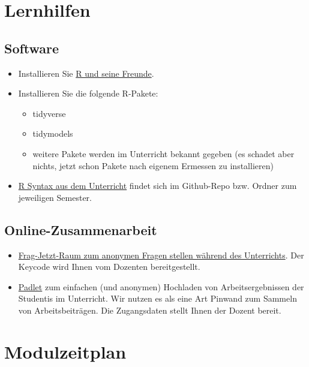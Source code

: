 \documentclass[
]{book}
\providecommand{\tightlist}{%
  \setlength{\itemsep}{0pt}\setlength{\parskip}{0pt}}
\begin{document}
\hypertarget{lernhilfen}{%
\section{Lernhilfen}\label{lernhilfen}}

\hypertarget{software}{%
\subsection{Software}\label{software}}

\begin{itemize}
\tightlist
\item
  Installieren Sie \href{https://data-se.netlify.app/2021/11/30/installation-von-r-und-seiner-freunde/}{R und seine Freunde}.
\item
  Installieren Sie die folgende R-Pakete:

  \begin{itemize}
  \tightlist
  \item
    tidyverse
  \item
    tidymodels
  \item
    weitere Pakete werden im Unterricht bekannt gegeben (es schadet aber nichts, jetzt schon Pakete nach eigenem Ermessen zu installieren)
  \end{itemize}
\item
  \href{https://github.com/sebastiansauer/Lehre}{R Syntax aus dem Unterricht} findet sich im Github-Repo bzw. Ordner zum jeweiligen Semester.
\end{itemize}

\hypertarget{online-zusammenarbeit}{%
\subsection{Online-Zusammenarbeit}\label{online-zusammenarbeit}}

\begin{itemize}
\tightlist
\item
  \href{https://frag.jetzt/home}{Frag-Jetzt-Raum zum anonymen Fragen stellen während des Unterrichts}. Der Keycode wird Ihnen vom Dozenten bereitgestellt.
\item
  \href{https://de.padlet.com/}{Padlet} zum einfachen (und anonymen) Hochladen von Arbeitsergebnissen der Studentis im Unterricht. Wir nutzen es als eine Art Pinwand zum Sammeln von Arbeitsbeiträgen. Die Zugangsdaten stellt Ihnen der Dozent bereit.
\end{itemize}

\hypertarget{modulzeitplan}{%
\section{Modulzeitplan}\label{modulzeitplan}}
\end{document}
